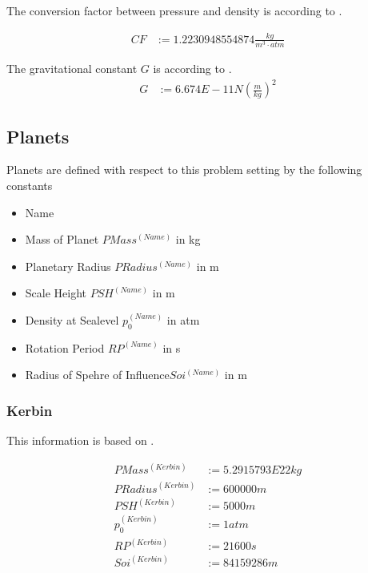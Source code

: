 \documentclass[11pt]{article}
\begin{document}
The  conversion factor between pressure and
density is according to \cite{Atmo}.

\begin{align}
  CF &:= 1.2230948554874 \frac{kg}{m^3\cdot atm}
\end{align}

The  gravitational constant $G$ is according to \cite{ACB}.
\begin{align}
  G &:= 6.674E-11 N\left(\frac{m}{kg}\right)^2
\end{align}

\subsection{Planets}

Planets are defined with respect to this problem setting by the
following constants

\begin{itemize}
\item Name
\item {} Mass of Planet $PMass^{(Name)}$ in kg
\item {} Planetary Radius $PRadius^{(Name)}$ in m
\item {} Scale Height $PSH^{(Name)}$ in m
\item {} Density at Sealevel $p_0^{(Name)}$ in atm
\item {} Rotation Period $RP^{(Name)}$ in s
\item {} Radius of Spehre of Influence$Soi^{(Name)}$ in m
\end{itemize}

\subsubsection{Kerbin}

This information is based on \cite{Kerbin}.

\begin{align*}
  PMass^{(Kerbin)} &:= 5.2915793E22 kg\\
  PRadius^{(Kerbin)} &:= 600000 m\\
  PSH^{(Kerbin)} &:= 5000 m\\
  p_0^{(Kerbin)} &:= 1 atm\\
  RP^{(Kerbin)} &:= 21600 s\\
  Soi^{(Kerbin)} &:= 84159286 m\\
\end{align*}
\end{document}
